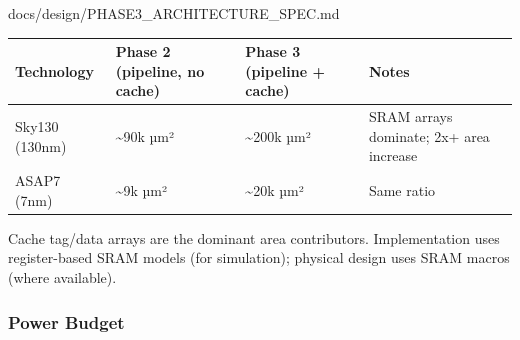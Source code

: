 \begin{relocated}{docs/design/PHASE3_ARCHITECTURE_SPEC.md}
{
\begin{longtable}[]{@{}
  >{\raggedright\arraybackslash}p{}
  >{\raggedright\arraybackslash}p{}
  >{\raggedright\arraybackslash}p{}
  >{\raggedright\arraybackslash}p{}@{}}
\toprule\noalign{}
\begin{minipage}[b]{\linewidth}\raggedright
Technology
\end{minipage} & \begin{minipage}[b]{\linewidth}\raggedright
Phase 2 (pipeline, no cache)
\end{minipage} & \begin{minipage}[b]{\linewidth}\raggedright
Phase 3 (pipeline + cache)
\end{minipage} & \begin{minipage}[b]{\linewidth}\raggedright
Notes
\end{minipage} \\
\midrule\noalign{}
\endhead
\bottomrule\noalign{}
\endlastfoot
Sky130 (130nm) & \textasciitilde90k µm² & \textasciitilde200k µm² & SRAM
arrays dominate; 2x+ area increase \\
ASAP7 (7nm) & \textasciitilde9k µm² & \textasciitilde20k µm² & Same
ratio \\
\end{longtable}
}

Cache tag/data arrays are the dominant area contributors. Implementation
uses register-based SRAM models (for simulation); physical design uses
SRAM macros (where available).

\subsubsection{Power Budget}\label{ds:ch:phase3-architecture:103-power-budget}


\end{relocated}
